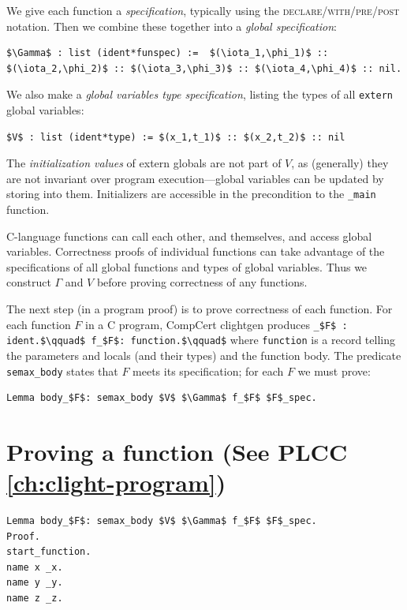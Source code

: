 \documentclass[12pt,fleqn,openany,oneside,showtrims]{memoir}
\newcommand{\ychapter}[2]{\chapter[#1]{#1 \hfill \normalsize #2}}
\begin{document}
We give each function a \emph{specification},
typically using the \textsc{declare/\linebreak[1]with/\linebreak[1]pre/\linebreak[1]post} notation.
Then we combine these together into a \emph{global specification}:
\begin{lstlisting}
$\Gamma$ : list (ident*funspec) :=  $(\iota_1,\phi_1)$ :: $(\iota_2,\phi_2)$ :: $(\iota_3,\phi_3)$ :: $(\iota_4,\phi_4)$ :: nil.
\end{lstlisting}

We also make a \emph{global variables type specification}, listing the 
types of all \lstinline{extern} global variables:
\begin{lstlisting}
$V$ : list (ident*type) := $(x_1,t_1)$ :: $(x_2,t_2)$ :: nil
\end{lstlisting}
The \emph{initialization values} of extern globals are not part of $V$,
as (generally) they are not invariant over program execution---global
variables can be updated by storing into them.  Initializers are accessible
in the precondition to the \lstinline{_main} function.

C-language functions can call each other, and themselves, and access global variables.  Correctness proofs of individual functions can take advantage of the
specifications of all global functions and types of global variables.
Thus we construct $\Gamma$ and $V$ before proving correctness of any
functions.

The next  step (in a program proof) is to prove correctness of each function.
For each function $F$  in a C program, CompCert clightgen produces\linebreak
\lstinline{_$F$ : ident.$\qquad$ f_$F$: function.$\qquad$}
where \lstinline{function} is a record telling the parameters and locals (and their types) and the function body.  The predicate \lstinline{semax_body} states that $F$ meets its specification; for each $F$ we must prove:
\begin{lstlisting}
Lemma body_$F$: semax_body $V$ $\Gamma$ f_$F$ $F$_spec.
\end{lstlisting}

\ychapter{Proving a function}{(See PLCC \autoref{ch:clight-program})}


\begin{lstlisting}
Lemma body_$F$: semax_body $V$ $\Gamma$ f_$F$ $F$_spec.
Proof.
start_function.
name x _x.
name y _y.
name z _z.
\end{lstlisting}
\end{document}
